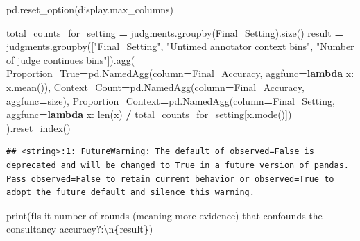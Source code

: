 \documentclass[
]{article}
\newenvironment{Shaded}{\begin{snugshade}}{\end{snugshade}}
\newcommand{\BuiltInTok}[1]{#1}
\newcommand{\CharTok}[1]{\textcolor[rgb]{0.31,0.60,0.02}{#1}}
\newcommand{\KeywordTok}[1]{\textcolor[rgb]{0.13,0.29,0.53}{\textbf{#1}}}
\newcommand{\NormalTok}[1]{#1}
\newcommand{\OperatorTok}[1]{\textcolor[rgb]{0.81,0.36,0.00}{\textbf{#1}}}
\newcommand{\SpecialCharTok}[1]{\textcolor[rgb]{0.81,0.36,0.00}{\textbf{#1}}}
\newcommand{\SpecialStringTok}[1]{\textcolor[rgb]{0.31,0.60,0.02}{#1}}
\newcommand{\StringTok}[1]{\textcolor[rgb]{0.31,0.60,0.02}{#1}}
\begin{document}
\begin{Shaded}
\begin{Highlighting}[]
\NormalTok{pd.reset\_option(}\StringTok{\textquotesingle{}display.max\_columns\textquotesingle{}}\NormalTok{)}

\NormalTok{total\_counts\_for\_setting }\OperatorTok{=}\NormalTok{ judgments.groupby(}\StringTok{\textquotesingle{}Final\_Setting\textquotesingle{}}\NormalTok{).size()}
\NormalTok{result }\OperatorTok{=}\NormalTok{ judgments.groupby([}\StringTok{"Final\_Setting"}\NormalTok{, }\StringTok{"Untimed annotator context bins"}\NormalTok{, }\StringTok{"Number of judge continues bins"}\NormalTok{]).agg(}
\NormalTok{    Proportion\_True}\OperatorTok{=}\NormalTok{pd.NamedAgg(column}\OperatorTok{=}\StringTok{\textquotesingle{}Final\_Accuracy\textquotesingle{}}\NormalTok{, aggfunc}\OperatorTok{=}\KeywordTok{lambda}\NormalTok{ x: x.mean()),}
\NormalTok{    Context\_Count}\OperatorTok{=}\NormalTok{pd.NamedAgg(column}\OperatorTok{=}\StringTok{\textquotesingle{}Final\_Accuracy\textquotesingle{}}\NormalTok{, aggfunc}\OperatorTok{=}\StringTok{\textquotesingle{}size\textquotesingle{}}\NormalTok{),}
\NormalTok{    Proportion\_Context}\OperatorTok{=}\NormalTok{pd.NamedAgg(column}\OperatorTok{=}\StringTok{\textquotesingle{}Final\_Setting\textquotesingle{}}\NormalTok{, aggfunc}\OperatorTok{=}\KeywordTok{lambda}\NormalTok{ x: }\BuiltInTok{len}\NormalTok{(x) }\OperatorTok{/}\NormalTok{ total\_counts\_for\_setting[x.mode()])}
\NormalTok{).reset\_index()}
\end{Highlighting}
\end{Shaded}

\begin{verbatim}
## <string>:1: FutureWarning: The default of observed=False is deprecated and will be changed to True in a future version of pandas. Pass observed=False to retain current behavior or observed=True to adopt the future default and silence this warning.
\end{verbatim}

\begin{Shaded}
\begin{Highlighting}[]
\BuiltInTok{print}\NormalTok{(}\SpecialStringTok{f\textquotesingle{}Is it number of rounds (meaning more evidence) that confounds the consultancy accuracy?:}\CharTok{\textbackslash{}n}\SpecialCharTok{\{}\NormalTok{result}\SpecialCharTok{\}}\SpecialStringTok{\textquotesingle{}}\NormalTok{)}
\end{Highlighting}
\end{Shaded}
\end{document}
